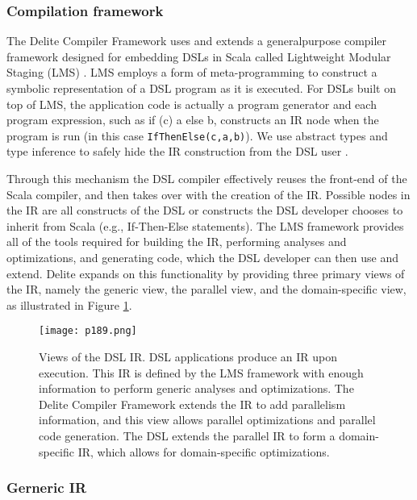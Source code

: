 \subsubsection{Compilation framework}


The Delite Compiler Framework uses and extends a generalpurpose compiler framework designed for embedding DSLs
in Scala called Lightweight Modular Staging (LMS) \cite{rompf2010lightweight}.
LMS employs a form of meta-programming to construct a
symbolic representation of a DSL program as it is executed.
For DSLs built on top of LMS, the application code is actually
a program generator and each program expression, such as
if (c) a else b, constructs an IR node when the program is
run (in this case \texttt{IfThenElse(c,a,b)}). We use abstract types
and type inference to safely hide the IR construction from the
DSL user \cite{rompf2011building}.

Through this mechanism the DSL compiler effectively
reuses the front-end of the Scala compiler, and then takes
over with the creation of the IR. Possible nodes in the IR
are all constructs of the DSL or constructs the DSL developer
chooses to inherit from Scala (e.g., If-Then-Else statements).
The LMS framework provides all of the tools required for
building the IR, performing analyses and optimizations, and
generating code, which the DSL developer can then use and
extend. Delite expands on this functionality by providing three
primary views of the IR, namely the generic view, the parallel
view, and the domain-specific view, as illustrated in Figure \ref{fig:p189}.


\begin{figure}[H]
	\centering
	\texttt{[image: p189.png]}
	\caption{Views of the DSL IR. DSL applications produce an IR
    upon execution. This IR is defined by the LMS framework
    with enough information to perform generic analyses and
    optimizations. The Delite Compiler Framework extends the IR
    to add parallelism information, and this view allows parallel
    optimizations and parallel code generation. The DSL extends
    the parallel IR to form a domain-specific IR, which allows for
    domain-specific optimizations.}
	\label{fig:p189}
\end{figure}

\subsubsection{Gerneric IR}

